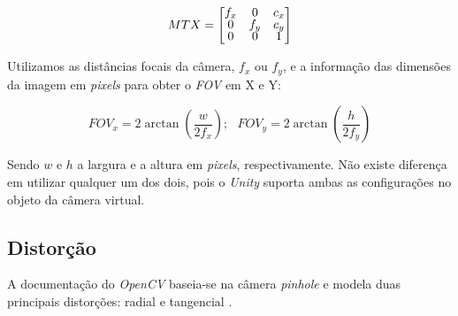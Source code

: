 \[ MTX = 
\renewcommand\arraystretch{.8}
\begin{bmatrix}
    f_x & 0 & c_x \\
    0 & f_y & c_y \\
    0 & 0 & 1
\end{bmatrix} \]

Utilizamos as distâncias focais da câmera, \(f_x\) ou \(f_y\), e a informação das dimensões da imagem em \textit{pixels} para obter o \textit{FOV} em X e Y: 

\[
FOV_x = 2 \arctan \left( \dfrac{w}{2f_x} \right) ;
\ \ \ FOV_y = 2 \arctan \left( \dfrac{h}{2f_y} \right) 
\]
    
Sendo \(w\) e \(h\) a largura e a altura em \textit{pixels}, respectivamente. Não existe diferença em utilizar qualquer um dos dois, pois o \textit{Unity} suporta ambas as configurações no objeto da câmera virtual.
    
\subsection{Distorção}

A documentação do \textit{OpenCV} baseia-se na câmera \textit{pinhole} e modela duas principais distorções: radial e tangencial \cite{Pinhole}. 

